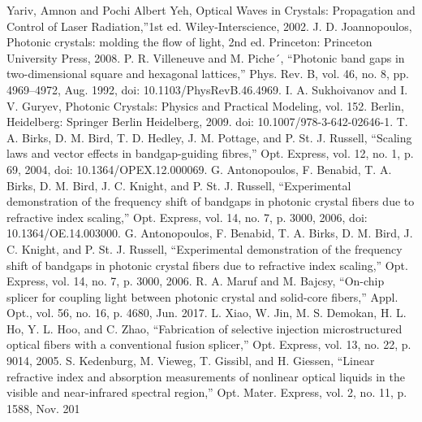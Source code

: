 \begin{thebibliography}{99}
 Yariv, Amnon and Pochi Albert Yeh, Optical Waves in Crystals: Propagation and Control of Laser Radiation,”1st ed. Wiley-Interscience, 2002.
 J. D. Joannopoulos, Photonic crystals: molding the flow of light, 2nd ed. Princeton: Princeton University Press, 2008.
 P. R. Villeneuve and M. Piche´, “Photonic band gaps in two-dimensional square and hexagonal lattices,” Phys. Rev. B, vol. 46, no. 8, pp. 4969–4972, Aug. 1992, doi: 10.1103/PhysRevB.46.4969.
 I. A. Sukhoivanov and I. V. Guryev, Photonic Crystals: Physics and Practical Modeling, vol. 152. Berlin, Heidelberg: Springer Berlin Heidelberg, 2009. doi: 10.1007/978-3-642-02646-1.
 T. A. Birks, D. M. Bird, T. D. Hedley, J. M. Pottage, and P. St. J. Russell, “Scaling laws and vector effects in bandgap-guiding fibres,” Opt. Express, vol. 12, no. 1, p. 69, 2004, doi: 10.1364/OPEX.12.000069.
 G. Antonopoulos, F. Benabid, T. A. Birks, D. M. Bird, J. C. Knight, and P. St. J. Russell, “Experimental demonstration of the frequency shift of bandgaps in photonic crystal fibers due to refractive index scaling,” Opt. Express, vol. 14, no. 7, p. 3000, 2006, doi: 10.1364/OE.14.003000.
 G. Antonopoulos, F. Benabid, T. A. Birks, D. M. Bird, J. C. Knight, and
P. St. J. Russell, “Experimental demonstration of the frequency shift of
bandgaps in photonic crystal fibers due to refractive index scaling,” Opt.
Express, vol. 14, no. 7, p. 3000, 2006.
 R. A. Maruf and M. Bajcsy, “On-chip splicer for coupling light between
photonic crystal and solid-core fibers,” Appl. Opt., vol. 56, no. 16, p.
4680, Jun. 2017.
 L. Xiao, W. Jin, M. S. Demokan, H. L. Ho, Y. L. Hoo, and C. Zhao,
“Fabrication of selective injection microstructured optical fibers with a
conventional fusion splicer,” Opt. Express, vol. 13, no. 22, p. 9014, 2005.
 S. Kedenburg, M. Vieweg, T. Gissibl, and H. Giessen, “Linear refractive
index and absorption measurements of nonlinear optical liquids in the
visible and near-infrared spectral region,” Opt. Mater. Express, vol. 2,
no. 11, p. 1588, Nov. 201


\end{thebibliography}
